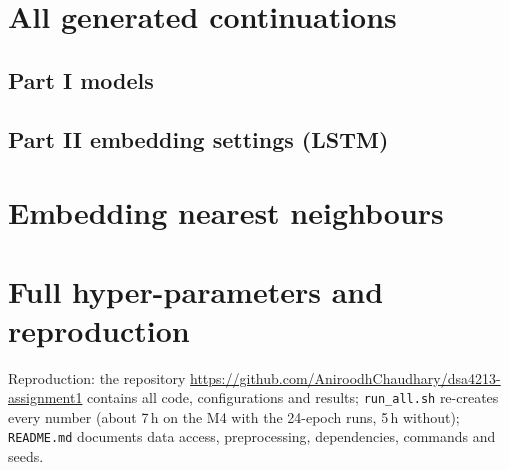 \documentclass[10pt,a4paper]{article}
\begin{document}



\clearpage
\appendix
\section{All generated continuations}
\subsection{Part I models}
{\raggedright\sloppy
{}
}
\begin{table}[H]\centering\small{}
\caption{Part I repetition statistics averaged over the five prompts.}\label{tab:p1rep}\end{table}
\subsection{Part II embedding settings (LSTM)}
{\raggedright\sloppy
{}
}
\begin{table}[H]\centering\small{}
\caption{Part II repetition statistics averaged over the five prompts.}\end{table}
\section{Embedding nearest neighbours}
\begin{table}[H]\centering\small{}
\caption{Five nearest neighbours (cosine) of probe words in the two pre-trained tables.}\end{table}
\section{Full hyper-parameters and reproduction}
\begin{table}[H]\centering\small{}
\caption{Every setting shared by the runs; per-run differences are the model/embedding blocks in \texttt{configs/}.}\end{table}
Reproduction: the repository \url{https://github.com/AniroodhChaudhary/dsa4213-assignment1} contains all code, configurations and results; \texttt{run\_all.sh} re-creates every number (about 7\,h on the M4 with the 24-epoch runs, 5\,h without);
\texttt{README.md} documents data access, preprocessing, dependencies, commands and seeds.
\end{document}
